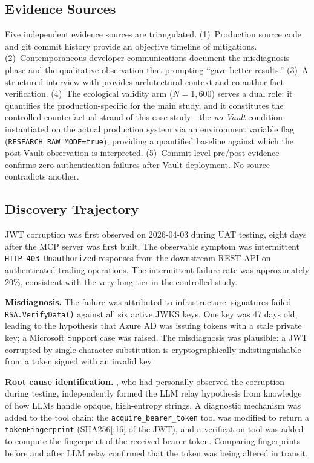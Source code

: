 \subsection{Evidence Sources}\label{sec:evidence}

Five independent evidence sources are triangulated. (1)~Production source code
and git commit history provide an objective timeline of mitigations.
(2)~Contemporaneous developer communications document the misdiagnosis phase
and the qualitative observation that prompting ``gave better results.''
(3)~A structured interview with
provides architectural context and co-author fact verification.
(4)~The ecological validity arm ($N\!=\!1{,}600$) serves a dual role: it
quantifies the production-specific \DFR{} for the main study, and it
constitutes the controlled counterfactual strand of this case study---the
\emph{no-Vault} condition instantiated on the actual production system via
an environment variable flag (\texttt{RESEARCH\_RAW\_MODE=true}), providing
a quantified baseline against which the post-Vault observation is interpreted. (5)~Commit-level pre/post evidence confirms zero
authentication failures after Vault deployment. No source contradicts another.

\subsection{Discovery Trajectory}\label{sec:trajectory}

JWT corruption was first observed on 2026-04-03 during UAT testing, eight days
after the MCP server was first built. The observable symptom was intermittent
\texttt{HTTP 403 Unauthorized} responses from the downstream REST API on
authenticated trading operations. The intermittent failure rate was
approximately 20\%, consistent with the very-long tier \DFR{} in the
controlled study.

\textbf{Misdiagnosis.}
The failure was attributed to infrastructure: signatures failed
\texttt{RSA.VerifyData()} against all six active JWKS keys. One key was 47 days
old, leading to the hypothesis that Azure AD was issuing tokens with a stale
private key; a Microsoft Support case was raised. The misdiagnosis was plausible:
a JWT corrupted by single-character substitution is cryptographically
indistinguishable from a token signed with an invalid key.

\textbf{Root cause identification.}
,
who had personally observed the corruption during testing, independently
formed the LLM relay hypothesis from knowledge of how LLMs handle opaque,
high-entropy strings. A diagnostic mechanism was added to the tool chain: the
\texttt{acquire\_bearer\_token} tool was modified to return a
\texttt{tokenFingerprint} (SHA256[:16] of the JWT), and a verification tool
was added to compute the fingerprint of the received bearer token. Comparing
fingerprints before and after LLM relay confirmed that the token was being
altered in transit.

